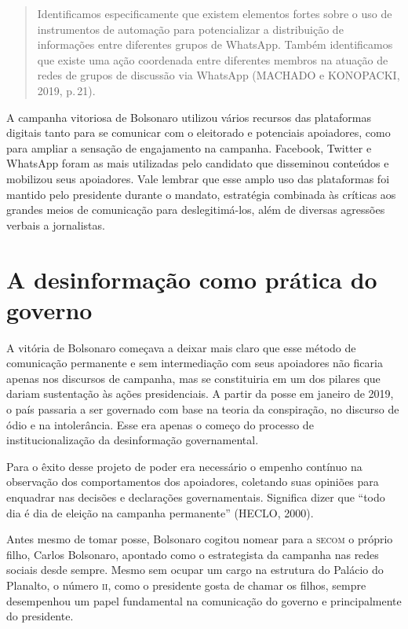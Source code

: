 \begin{quote}
Identificamos especificamente que existem elementos fortes sobre o uso
de instrumentos de automação para potencializar a distribuição de
informações entre diferentes grupos de WhatsApp. Também identificamos
que existe uma ação coordenada entre diferentes membros na atuação de
redes de grupos de discussão via WhatsApp (MACHADO e KONOPACKI, 2019, p.\,21).
\end{quote}

A campanha vitoriosa de Bolsonaro utilizou vários recursos das
plataformas digitais tanto para se comunicar com o eleitorado e potenciais
apoiadores, como para ampliar a sensação de engajamento na campanha.
Facebook, Twitter e WhatsApp foram as mais utilizadas pelo candidato que
disseminou conteúdos e mobilizou seus apoiadores. Vale lembrar que esse
amplo uso das plataformas foi mantido pelo presidente durante o mandato,
estratégia combinada às críticas aos grandes meios de comunicação para
deslegitimá-los, além de diversas agressões verbais a jornalistas.

\section{A desinformação como prática do governo}

A vitória de Bolsonaro começava a deixar mais claro que esse método de
comunicação permanente e sem intermediação com seus apoiadores não
ficaria apenas nos discursos de campanha, mas se constituiria em um dos
pilares que dariam sustentação às ações presidenciais. A partir da posse
em janeiro de 2019, o país passaria a ser governado com base na teoria da
conspiração, no discurso de ódio e na intolerância. Esse era apenas o
começo do processo de institucionalização da desinformação
governamental.

Para o êxito desse projeto de poder era necessário o empenho contínuo na
observação dos comportamentos dos apoiadores, coletando suas opiniões
para enquadrar nas decisões e declarações governamentais. Significa
dizer que ``todo dia é dia de eleição na campanha permanente'' (HECLO,
2000).

Antes mesmo de tomar posse, Bolsonaro cogitou nomear para a \textsc{secom} o próprio filho, 
Carlos Bolsonaro, apontado como
o estrategista da campanha nas redes sociais desde sempre. Mesmo sem ocupar um
cargo na estrutura do Palácio do Planalto, o número \textsc{ii}, como o presidente
gosta de chamar os filhos, sempre desempenhou um papel fundamental na
comunicação do governo e principalmente do presidente.

